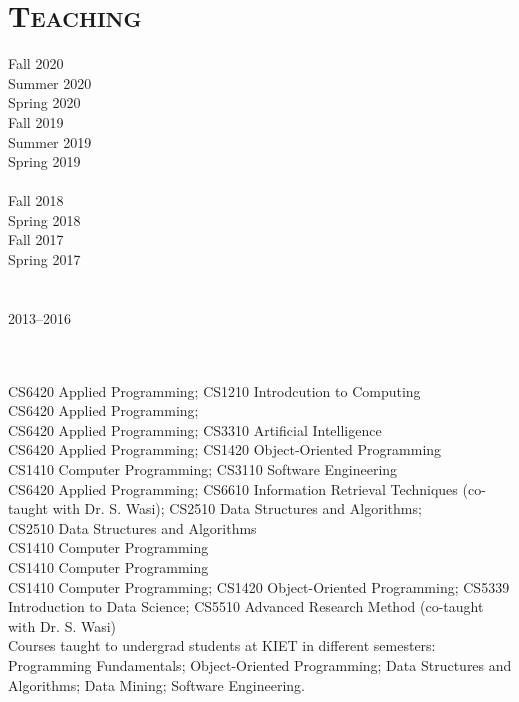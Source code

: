 \documentclass[a4paper, 10pt]{article}
\begin{document}
\section*{\normalfont\textsc{Teaching}}
\hfill\begin{minipage}{0.22\textwidth}
Fall 2020\textcolor{lightgray}{\dotfill}\\
Summer 2020\textcolor{lightgray}{\dotfill}\\
Spring 2020\textcolor{lightgray}{\dotfill}\\
Fall 2019\textcolor{lightgray}{\dotfill}\\
Summer 2019\textcolor{lightgray}{\dotfill}\\
Spring 2019\textcolor{lightgray}{\dotfill}\\\\
Fall 2018\textcolor{lightgray}{\dotfill}\\
Spring 2018\textcolor{lightgray}{\dotfill}\\
Fall 2017\textcolor{lightgray}{\dotfill}\\
Spring 2017\textcolor{lightgray}{\dotfill}\\\\\\
2013--2016\textcolor{lightgray}{\dotfill}\\\\\\
\end{minipage}
\begin{minipage}{0.75\textwidth}
CS6420 Applied Programming; CS1210 Introdcution to Computing\\
CS6420 Applied Programming;\\
CS6420 Applied Programming; CS3310 Artificial Intelligence\\
CS6420 Applied Programming; CS1420 Object-Oriented Programming\\
CS1410 Computer Programming; CS3110 Software Engineering\\
CS6420 Applied Programming; CS6610 Information Retrieval Techniques (co-taught with Dr. S. Wasi); CS2510 Data Structures and Algorithms;\\
CS2510 Data Structures and Algorithms\\
CS1410 Computer Programming\\
CS1410 Computer Programming\\
CS1410 Computer Programming; CS1420 Object-Oriented Programming; CS5339 Introduction to Data Science; CS5510 Advanced Research Method (co-taught with Dr. S. Wasi)\\
Courses taught to undergrad students at KIET in different semesters: Programming Fundamentals; Object-Oriented Programming; Data Structures and Algorithms; Data Mining; Software Engineering.\\%
\end{minipage}
\end{document}
